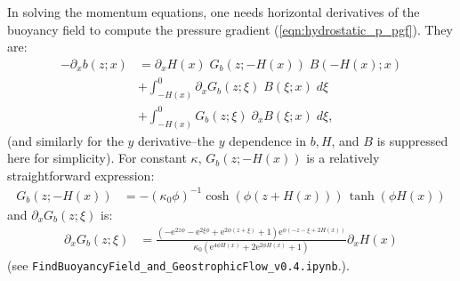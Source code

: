 \documentclass[10pt]{amsart}
\begin{document}
In solving the momentum equations, one needs horizontal derivatives of the buoyancy field to compute the pressure gradient (\ref{eqn:hydrostatic_p_pgf}).
They are:
\begin{align}
- \partial_x b(z; x) &= \partial_x H(x)\;  G_b(z; -H(x)) \; B(-H(x); x)    \nonumber \\
&+  \int_{-H(x)}^{0} \partial_x G_b(z; \xi) \; B(\xi; x) \; d \xi  \nonumber \\
&+ \int_{-H(x)}^{0} G_b(z; \xi) \; \partial_x B(\xi; x) \; d \xi  ,
\end{align}
(and similarly for the $y$ derivative--the $y$ dependence in $b, H$, and $B$ is suppressed here for simplicity).
For constant $\kappa$, $G_b(z; -H(x))$ is a relatively straightforward expression:
\begin{align}
G_b(z; -H(x)) & = 
-(\kappa_0 \phi)^{-1} \cosh \left( \phi (z + H(x)) \right) \, \tanh \left( \phi H(x) \right) 
\end{align}
and $\partial_x G_b(z; \xi)$ is:
\begin{align}
\partial_x G_b(z; \xi) & = 
\frac{\left(- \mathrm{e}^{2 z \phi} - \mathrm{e}^{2 \xi \phi} + \mathrm{e}^{2 \phi \left(z + \xi\right)} + 1\right) \mathrm{e}^{\phi \left(- z - \xi + 2 H{\left(x \right)}\right)} }{\kappa_0 \left(\mathrm{e}^{4 \phi H{\left(x \right)}} + 2 \mathrm{e}^{2 \phi H{\left(x \right)}} + 1\right)} \partial_x H{\left(x \right)} 
\end{align}
(see \texttt{FindBuoyancyField\_and\_GeostrophicFlow\_v0.4.ipynb}.).




\end{document}
